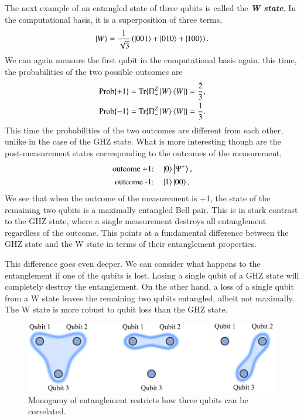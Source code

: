 The next example of an entangled state of three qubits is called the \textit{\textbf{W state}}.
In the computational basis, it is a superposition of three terms,
\begin{equation}
    \left| W \right\rangle = \frac{1}{\sqrt{3}} \left( \left| 001 \right\rangle + \left| 010 \right\rangle + \left| 100 \right\rangle \right).
\end{equation}
We can again measure the first qubit in the computational basis again.
this time, the probabilities of the two possible outcomes are
\begin{align}
    \text{Prob}\{+1\} & = \text{Tr} \{ \Pi^Z_+ \left| W \right\rangle\left\langle W \right| \} = \frac{2}{3}, \\
    \text{Prob}\{-1\} & = \text{Tr} \{ \Pi^Z_- \left| W \right\rangle\left\langle W \right| \} = \frac{1}{3}.
\end{align}
This time the probabilities of the two outcomes are different from each other, unlike in the case of the GHZ state.
What is more interesting though are the post-measurement states corresponding to the outcomes of the measurement,
\begin{align}
    \text{outcome +1:} & \quad \ket{0}\ket{\Psi^+}, \label{eq:14-2_W_post_meas_0} \\
    \text{outcome -1:} & \quad \ket{1}\ket{00},
\end{align}
We see that when the outcome of the measurement is +1, the state of the remaining two qubits is a maximally entangled Bell pair.
This is in stark contrast to the GHZ state, where a single measurement destroys all entanglement regardless of the outcome.
This points at a fundamental difference between the GHZ state and the W state in terms of their entanglement properties.

This difference goes even deeper.
We can consider what happens to the entanglement if one of the qubits is lost.
Losing a single qubit of a GHZ state will completely destroy the entanglement.
On the other hand, a loss of a single qubit from a W state leaves the remaining two qubits entangled, albeit not maximally.
The W state is more robust to qubit loss than the GHZ state.

\begin{figure}[t]
    \centering
    \includegraphics[width=\textwidth]{lesson14/14-2_monogamy.pdf}
    \caption[Monogamy of entanglement.]{Monogamy of entanglement restricts how three qubits can be correlated.}
    \label{fig:14-2_monogamy}
\end{figure}

